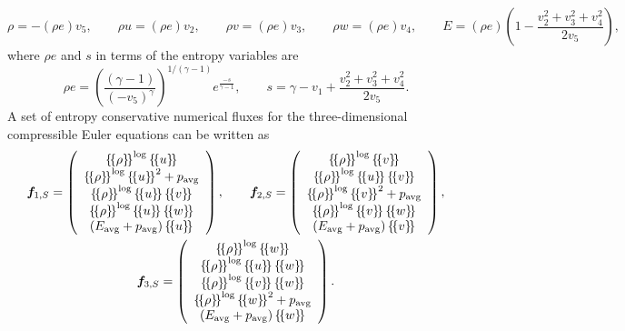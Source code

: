\documentclass[10pt]{amsart}
\theoremstyle{definition}
\theoremstyle{lemma}
\theoremstyle{theorem}
\theoremstyle{assumption}
\newcommand{\LRp}[1]{\left( #1 \right)}
\newcommand{\LRc}[1]{\left\{ #1 \right\}}
\newcommand{\avg}[1] {\ensuremath{\LRc{\!\{#1\}\!}}}
\begin{document}
{\begin{equation}
\rho = -(\rho e) v_5, \qquad \rho u = (\rho e) v_2, \qquad \rho v = (\rho e) v_3, \qquad \rho w = (\rho e) v_4, \qquad E = (\rho e)\LRp{1 - \frac{{v_2^2+v_3^2+v_4^2}}{2 v_5}},
\end{equation}
where $\rho e$ and $s$ in terms of the entropy variables are 
\begin{equation}
\rho e = \LRp{\frac{(\gamma-1)}{\LRp{-v_5}^{\gamma}}}^{1/(\gamma-1)}e^{\frac{-s}{\gamma-1}}, \qquad s = \gamma - v_1 + \frac{{v_2^2+v_3^2+v_4^2}}{2v_5}.
\end{equation}
A set of entropy conservative numerical fluxes for the three-dimensional compressible Euler equations can be written as
\begin{gather}
\bm{f}_{1,S} = \LRp{\begin{array}{c}
\avg{\rho}^{\log}\avg{u}\\
\avg{\rho}^{\log}\avg{u}^2 + p_{\rm avg}\\
\avg{\rho}^{\log}\avg{u}\avg{v}\\
\avg{\rho}^{\log}\avg{u}\avg{w}\\
(E_{\rm avg}+ p_{\rm avg})\avg{u}\\
\end{array}}, 
\qquad 
\bm{f}_{2,S} = \LRp{\begin{array}{c}
\avg{\rho}^{\log}\avg{v}\\
\avg{\rho}^{\log}\avg{u}\avg{v}\\
\avg{\rho}^{\log}\avg{v}^2 + p_{\rm avg}\\
\avg{\rho}^{\log}\avg{v}\avg{w}\\
(E_{\rm avg}+ p_{\rm avg})\avg{v}\\
\end{array}},\\
\bm{f}_{3,S} = \LRp{\begin{array}{c}
\avg{\rho}^{\log}\avg{w}\\
\avg{\rho}^{\log}\avg{u}\avg{w}\\
\avg{\rho}^{\log}\avg{v}\avg{w}\\
\avg{\rho}^{\log}\avg{w}^2 + p_{\rm avg}\\
(E_{\rm avg}+ p_{\rm avg})\avg{w}\\
\end{array}}.\nonumber

\end{gather}}
\end{document}
